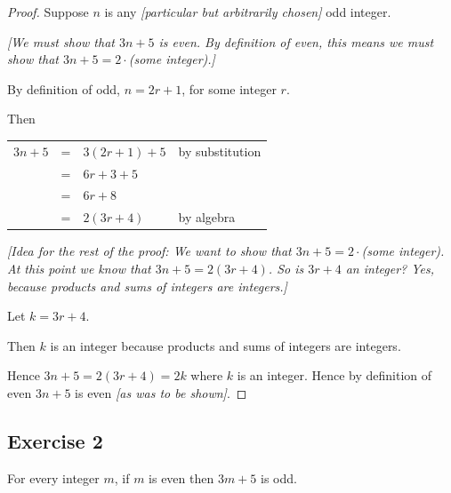 \documentclass[14pt]{extarticle}
\newcommand{\cy}{\color{cyan}}
\begin{document}
\begin{proof}
Suppose $n$ is any {\it [particular but arbitrarily chosen]} odd integer. 

{\it [We must show that $3n + 5$ is even. By definition of even, this means we must show that $3n + 5 = 2\cdot$(some integer).]}

By definition of odd, $n = 2r + 1$, for some integer $r$. 

Then

\begin{center}
\begin{tabular}{rcll}
$3n + 5$ & = & $3(2r + 1) + 5$ & \cy by substitution \\
& = & $6r + 3 + 5$ & \\
& = & $6r + 8$ & \\
& = & $2(3r + 4)$ & \cy by algebra \\
\end{tabular}
\end{center}

{\it [Idea for the rest of the proof: We want to show that $3n + 5 = 2\cdot$(some integer). At this point we know that $3n + 5 = 2(3r + 4)$. So is $3r + 4$ an integer? Yes, because products and sums of integers are integers.]}

Let $k = 3r + 4$. 

Then $k$ is an integer because products and sums of integers are integers. 

Hence $3n + 5 = 2(3r+4) = 2k$ where $k$ is an integer. Hence by definition of even $3n+5$ is even {\it [as was to be shown]}.
\end{proof}

\subsection{Exercise 2}
For every integer $m$, if $m$ is even then $3m + 5$ is odd.
\end{document}
